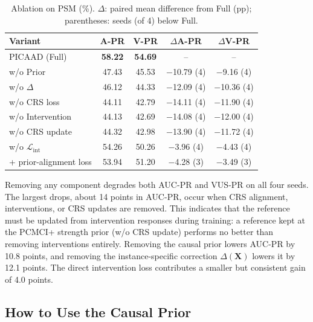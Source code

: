 \begin{table}[t]
\centering
\caption{Ablation on PSM (\%). \(\Delta\): paired mean difference from Full (pp); parentheses: seeds (of 4) below Full.}
\label{tab:ablation}
\small
\setlength{\tabcolsep}{3pt}
\begin{tabular}{lcccc}
\toprule
Variant & A-PR & V-PR & \(\Delta\)A-PR & \(\Delta\)V-PR \\
\midrule
PICAAD (Full)                      & \textbf{58.22} & \textbf{54.69} & --           & --           \\
w/o Prior                          & 47.43 & 45.53 & \(-\)10.79 (4) & \(-\)9.16 (4)  \\
w/o \(\Delta\)                     & 46.12 & 44.33 & \(-\)12.09 (4) & \(-\)10.36 (4) \\
w/o CRS loss                       & 44.11 & 42.79 & \(-\)14.11 (4) & \(-\)11.90 (4) \\
w/o Intervention                   & 44.13 & 42.69 & \(-\)14.08 (4) & \(-\)12.00 (4) \\
w/o CRS update                     & 44.32 & 42.98 & \(-\)13.90 (4) & \(-\)11.72 (4) \\
w/o \(\mathcal{L}_{\mathrm{int}}\) & 54.26 & 50.26 & \(-\)3.96 (4)  & \(-\)4.43 (4)  \\
\midrule
+ prior-alignment loss             & 53.94 & 51.20 & \(-\)4.28 (3)  & \(-\)3.49 (3)  \\
\bottomrule
\end{tabular}
\end{table}

Removing any component degrades both AUC-PR and VUS-PR on all four seeds. The
largest drops, about 14 points in AUC-PR, occur when CRS alignment,
interventions, or CRS updates are removed. This indicates that the reference
must be updated from intervention responses during training: a reference kept
at the PCMCI+ strength prior (w/o CRS update) performs no better than removing
interventions entirely. Removing the causal prior lowers AUC-PR by 10.8 points,
and removing the instance-specific correction \(\Delta(\mathbf{X})\) lowers it
by 12.1 points. The direct intervention loss contributes a smaller but
consistent gain of 4.0 points.

\subsection{How to Use the Causal Prior}
\label{sec:prior_usage}

